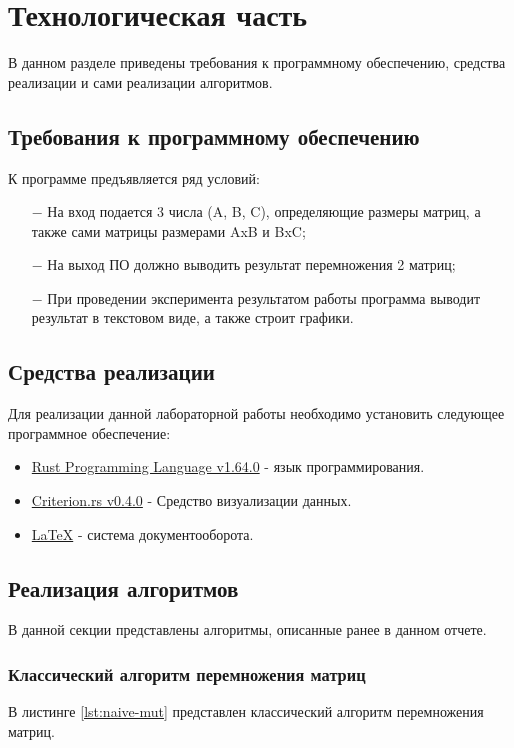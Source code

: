 \chapter{Технологическая часть}

В данном разделе приведены требования к программному обеспечению, средства реализации и сами реализации алгоритмов.

\section{Требования к программному обеспечению}
К программе предъявляется ряд условий:
\begin{itemize}
    \item[$-$] На вход подается 3 числа (A, B, C), определяющие размеры матриц, а также сами матрицы размерами AxB и BxC;
    \item[$-$] На выход ПО должно выводить результат перемножения 2 матриц;
    \item[$-$] При проведении эксперимента результатом работы программа
    выводит результат в текстовом виде, а также строит графики.
\end{itemize}

\section{Средства реализации}
Для реализации данной лабораторной работы необходимо установить следующее программное обеспечение:
\begin{itemize}
    \item \href{https://www.rust-lang.org/}{Rust Programming Language v1.64.0} - язык программирования.
    \item \href{https://github.com/bheisler/criterion.rs}{Criterion.rs v0.4.0} - Средство визуализации данных.
    \item \href{https://www.latex-project.org/}{LaTeX} - система документооборота.
\end{itemize}

\section{Реализация алгоритмов}
В данной секции представлены алгоритмы, описанные ранее в данном отчете.
\newpage

\subsection{Классический алгоритм перемножения матриц}
В листинге \ref{lst:naive-mut} представлен классический алгоритм перемножения матриц.



